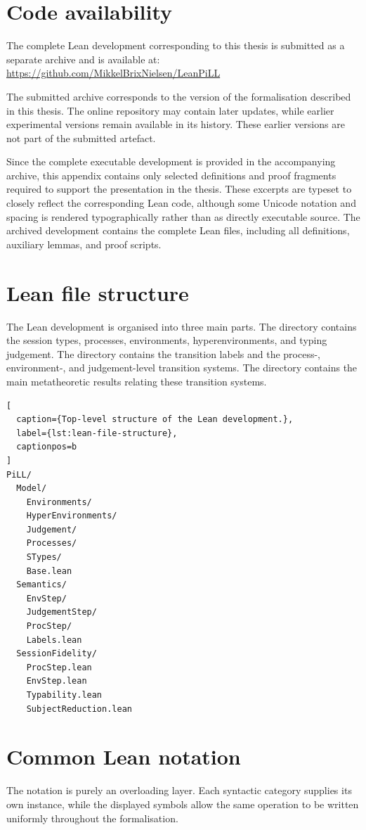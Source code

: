 \appendix
\section{Code availability}\label{app:code-availability}
The complete Lean development corresponding to this thesis is submitted as a separate archive and is available at: \url{https://github.com/MikkelBrixNielsen/LeanPiLL}

The submitted archive corresponds to the version of the formalisation described in this thesis. The online repository may contain later updates, while earlier experimental versions remain available in its history. These earlier versions are not part of the submitted artefact.

Since the complete executable development is provided in the accompanying archive, this appendix contains only selected definitions and proof fragments required to support the presentation in the thesis. These excerpts are typeset to closely reflect the corresponding Lean code, although some Unicode notation and spacing is rendered typographically rather than as directly executable source. The archived development contains the complete Lean files, including all definitions, auxiliary lemmas, and proof scripts.

\section{Lean file structure}\label{app:file-structure}
The Lean development is organised into three main parts. The  directory contains the session types, processes, environments, hyperenvironments, and typing judgement. The  directory contains the transition labels and the process-, environment-, and judgement-level transition systems. The  directory contains the main metatheoretic results relating these transition systems.

\begin{lstlisting}[
  caption={Top-level structure of the Lean development.},
  label={lst:lean-file-structure},
  captionpos=b
]
PiLL/
  Model/
    Environments/
    HyperEnvironments/
    Judgement/
    Processes/
    STypes/
    Base.lean
  Semantics/
    EnvStep/
    JudgementStep/
    ProcStep/
    Labels.lean
  SessionFidelity/
    ProcStep.lean
    EnvStep.lean
    Typability.lean
    SubjectReduction.lean
\end{lstlisting}

\section{Common Lean notation}\label{app:common-notation}
The notation is purely an overloading layer. Each syntactic category supplies its own instance, while the displayed symbols allow the same operation to be written uniformly throughout the formalisation.

